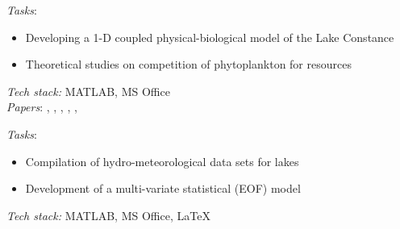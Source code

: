 \documentclass[
	a4paper,
]{fortysecondscv}
\begin{document}
\begin{cvtable}[1.0]
	{\href{https://www.uni-konstanz.de/}{\color{pblue}{Uni. Konstanz, Germany}}}
	{\textit{Tasks}:
	\begin{itemize}[topsep=0pt,itemsep=0pt,partopsep=0pt, parsep=0pt, leftmargin=*]
     \item Developing a 1-D coupled physical-biological model of the Lake Constance
     \item Theoretical studies on competition of phytoplankton for resources 
    \end{itemize}
      \textit{Tech stack:} MATLAB, MS Office \\
      \textit{Papers}:
      \href{https://doi.org/10.1111/j.1365-2486.2009.02158.x}{\color{pblue}{1}}, %
      \href{https://doi.org/10.1016/j.jtbi.2012.01.044}{\color{pblue}{2}}, %
      \href{https://doi.org/10.1007/s12080-012-0164-2}{\color{pblue}{3}}, %
      \href{https://doi.org/10.1111/j.1600-0706.2012.20603.x}{\color{pblue}{4}}, %
      \href{https://doi.org/10.1007/s10750-013-1551-4}{\color{pblue}{5}}, %
      \href{https://doi.org/10.1890/14-0839.1}{\color{pblue}{6}} %
      }
      
	{\href{https://www.metu.edu.tr/}{\color{pblue}{METU, Turkey}}}
	{\textit{Tasks}:
	\begin{itemize}[topsep=0pt,itemsep=0pt,partopsep=0pt, parsep=0pt, leftmargin=*]
     \item Compilation of hydro-meteorological data sets for lakes
     \item Development of a multi-variate statistical (EOF) model
     \end{itemize}
     \textit{Tech stack:} MATLAB, MS Office, \LaTeX \\
     }
\end{cvtable}
\end{document}
